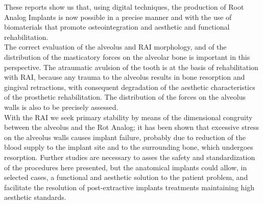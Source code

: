 These reports show us that, using digital techniques, the production of Root Analog Implants is now possible in a precise manner and with the use of biomaterials that promote osteointegration and aesthetic and functional rehabilitation.\\
The correct evaluation of the alveolus and RAI morphology, and of the distribution of the masticatory forces on the alveolar bone is important in this perspective. The atraumatic avulsion of the tooth is at the basis of rehabilitation with RAI, because any trauma to the alveolus results in bone resorption and gingival retractions, with consequent degradation of the aesthetic characteristics of the prosthetic rehabilitation. The distribution of the forces on the alveolus walls is also to be precisely assessed. \\ With the RAI we seek primary stability by means of the dimensional congruity between the alveolus and the Rot Analog; it has been shown that excessive stress on the alveolus walls causes implant failure, probably due to reduction of the blood supply to the implant site and to the surrounding bone, which undergoes resorption. Further studies are necessary to asses the safety and standardization of the procedures here presented, but the anatomical implants could allow, in selected cases, a functional and aesthetic solution to the patient problem, and facilitate the resolution of post-extractive implants treatments maintaining high aesthetic standards.


